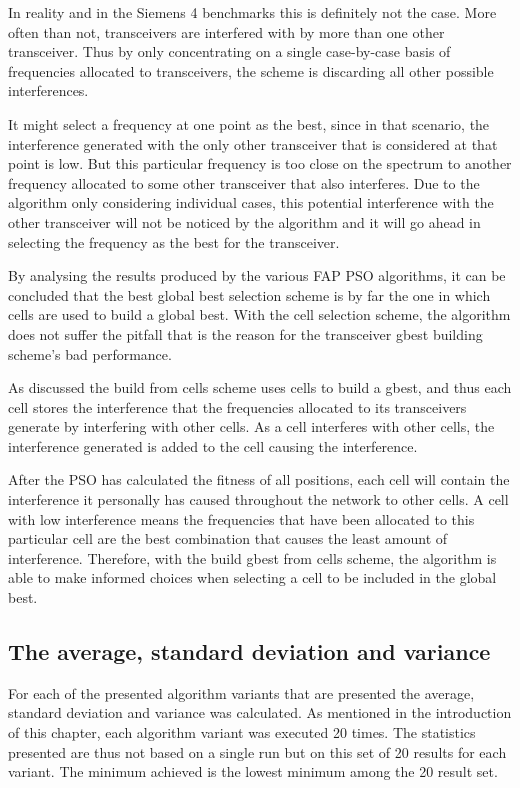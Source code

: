 In reality and in the Siemens 4 benchmarks this is definitely not the case. More often than not, transceivers are interfered with by more than one other transceiver. Thus by only concentrating on a single case-by-case basis of frequencies allocated to transceivers, the scheme is discarding all other possible interferences. 

It might select a frequency at one point as the best, since in that scenario, the interference generated with the only other transceiver that is considered at that point is low. But this particular frequency is too close on the spectrum to another frequency allocated to some other transceiver that also interferes. Due to the algorithm only considering individual cases, this potential interference with the other transceiver will not be noticed by the algorithm and it will go ahead in selecting the frequency as the best for the transceiver.

By analysing the results produced by the various FAP PSO algorithms, it can be concluded that the best global best selection scheme is by far the one in which cells are used to build a global best. With the cell selection scheme, the algorithm does not suffer the pitfall that is the reason for the transceiver gbest building scheme's bad performance.

As discussed the build from cells scheme uses cells to build a gbest, and thus each cell stores the interference that the frequencies allocated to its transceivers generate by interfering with other cells. As a cell interferes with other cells, the interference generated is added to the cell causing the interference.

After the PSO has calculated the fitness of all positions, each cell will contain the interference it personally has caused throughout the network to other cells. A cell with low interference means the frequencies that have been allocated to this particular cell are the best combination that causes the least amount of interference. Therefore, with the build gbest from cells scheme, the algorithm is able to make informed choices when selecting a cell to be included in the global best. 
\subsection{The average, standard deviation and variance}
For each of the presented algorithm variants that are presented the average, standard deviation and variance was calculated. As mentioned in the introduction of this chapter, each algorithm variant was executed 20 times. The statistics presented are thus not based on a single run but on this set of 20 results for each variant. The minimum achieved is the lowest minimum among the 20 result set.

